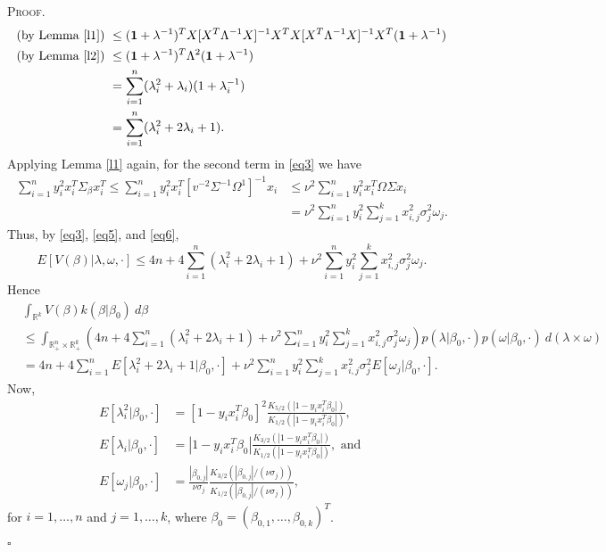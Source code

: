 \documentclass[12pt]{article}
\newcounter{ProofCounter}
\newenvironment{Proof}{\stepcounter{ProofCounter}\textsc{Proof.}}{\hfill$\square$}
\begin{document}
\begin{Proof}
\begin{align}
    \text{(by Lemma \ref{l1})}\ & \leq (\bm{1} + \lambda^{-1})^T X[X^T\Lambda^{-1}X]^{-1}X^T X[X^T\Lambda^{-1}X]^{-1}X^T (\bm{1} + \lambda^{-1}) \nonumber \\
    \text{(by Lemma \ref{l2})}\ & \leq (\bm{1} + \lambda^{-1})^T \Lambda^{2} (\bm{1} + \lambda^{-1})\nonumber \\
    & = \sum_{i=1}^{n}(\lambda_i^2 + \lambda_i)(1 + \lambda_i^{-1}) \nonumber \\
    & = \sum_{i=1}^{n}(\lambda_i^2 + 2\lambda_i + 1).
    \label{eq5}
  \end{align}
  Applying Lemma \ref{l1} again, for the second term in \eqref{eq3} we have 
  \begin{align}
    \sum_{i=1}^{n}y_i^2 x_i^T\Sigma_{\beta} x_i^T \leq \sum_{i=1}^{n}y_i^2 x_i^T[v^{-2}\Sigma^{-1}\Omega^{1}]^{-1}x_i & \leq \nu^2\sum_{i=1}^{n} y_i^2
    x_i^T \Omega \Sigma x_i \nonumber \\
    & = \nu^2 \sum_{i=1}^{n}y_i^2 \sum_{j=1}^{k}x_{i,j}^2 \sigma_{j}^2 \omega_j.
    \label{eq6}
  \end{align}
  Thus, by \eqref{eq3}, \eqref{eq5}, and \eqref{eq6}, 
  \[
    E[V(\beta)|\lambda, \omega, \cdot] \leq 4n + 4\sum_{i=1}^{n}(\lambda_i^2 + 2\lambda_i + 1) + \nu^2 \sum_{i=1}^{n}y_i^2 \sum_{j=1}^{k}x_{i,j}^2
    \sigma_j^2 \omega_j.
  \]
  Hence 
  \begin{align}
    & \int_{\mathbb{R}^{k}} V(\beta) k(\beta|\beta_0)\ d\beta \nonumber \\
    & \leq \int_{\mathbb{R}^{n}_+ \times \mathbb{R}^{k}_+}
    \left(4n + 4\sum_{i=1}^{n}(\lambda_i^2 + 2\lambda_i + 1) + \nu^2 \sum_{i=1}^{n}y_i^2 \sum_{j=1}^{k}x_{i,j}^2 \sigma_j^2 \omega_j \right)
    p(\lambda|\beta_0, \cdot) p(\omega|\beta_0,\cdot)\ d(\lambda \times \omega) \nonumber \\
    & = 4n + 4\sum_{i=1}^{n}E[\lambda_i^2 + 2\lambda_i + 1|\beta_0, \cdot] + \nu^2\sum_{i=1}^{n}y_i^2\sum_{j=1}^{k}x_{i,j}^2\sigma_j^2
    E[\omega_j|\beta_0,\cdot].
    \label{eq7}
  \end{align}
  Now,
  \begin{align*}
    E[\lambda_i^2|\beta_0, \cdot] & = [1 - y_ix_i^T\beta_0]^2 \frac{K_{5/2}\left( |1 - y_ix_i^T\beta_0| \right)}{K_{1/2}\left( |1 - y_ix_i^T\beta_0|
    \right)}, \\
    E[\lambda_i|\beta_0, \cdot] & = |1 - y_ix_i^T\beta_0| \frac{K_{3/2}\left( |1 - y_ix_i^T\beta_0| \right)}{K_{1/2}\left( |1 - y_ix_i^T\beta_0|
    \right)}, \text{ and } \\
    E[\omega_j|\beta_0, \cdot] & = \frac{|\beta_{0,j}|}{\nu\sigma_j} \frac{K_{3/2}\left( |\beta_{0,j}| / (\nu\sigma_j) \right)}{ 
    K_{1/2}\left( |\beta_{0,j}| / (\nu \sigma_{j}) \right)},
  \end{align*}
  for $i = 1,\dots, n$ and $j = 1,\dots,k$, where $\beta_0 = (\beta_{0,1}, \dots, \beta_{0,k})^T$.



\end{Proof}
\end{document}
